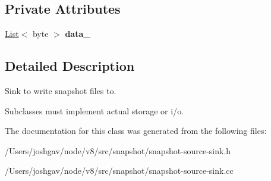 \subsection*{Private Attributes}
\begin{DoxyCompactItemize}
\item 
\hyperlink{classv8_1_1internal_1_1_list}{List}$<$ byte $>$ {\bfseries data\+\_\+}\hypertarget{classv8_1_1internal_1_1_snapshot_byte_sink_a50fe95d82caa3fe04369b76867856730}{}\label{classv8_1_1internal_1_1_snapshot_byte_sink_a50fe95d82caa3fe04369b76867856730}

\end{DoxyCompactItemize}


\subsection{Detailed Description}
Sink to write snapshot files to.

Subclasses must implement actual storage or i/o. 

The documentation for this class was generated from the following files\+:\begin{DoxyCompactItemize}
\item 
/\+Users/joshgav/node/v8/src/snapshot/snapshot-\/source-\/sink.\+h\item 
/\+Users/joshgav/node/v8/src/snapshot/snapshot-\/source-\/sink.\+cc\end{DoxyCompactItemize}
